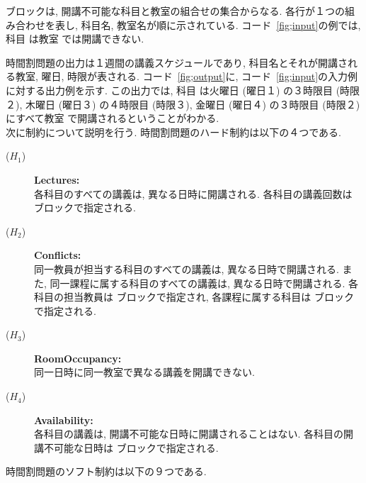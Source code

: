  ブロックは, 開講不可能な科目と教室の組合せの集合からなる. 各行が１つの組み合わせを表し, 科目名, 教室名が順に示されている. コード~\ref{fig;input}の例では, 科目  は教室  では開講できない.

時間割問題の出力は１週間の講義スケジュールであり, 科目名とそれが開講される教室, 曜日, 時限が表される. コード~\ref{fig;output}に, コード~\ref{fig;input}の入力例に対する出力例を示す. この出力では, 科目  は火曜日 (曜日１) の３時限目 (時限２), 木曜日 (曜日３) の４時限目 (時限３), 金曜日 (曜日４) の３時限目 (時限２) にすべて教室  で開講されるということがわかる.\\

次に制約について説明を行う. 時間割問題のハード制約は以下の４つである.

\begin{description}
\item[($H_1$)] \textbf{Lectures:}\\
各科目のすべての講義は, 異なる日時に開講される. 各科目の講義回数は  ブロックで指定される.
\item[($H_2$)] \textbf{Conflicts:}\\
同一教員が担当する科目のすべての講義は, 異なる日時で開講される. また, 同一課程に属する科目のすべての講義は, 異なる日時で開講される. 各科目の担当教員は  ブロックで指定され, 各課程に属する科目は  ブロックで指定される.
\item[($H_3$)] \textbf{RoomOccupancy:}\\
同一日時に同一教室で異なる講義を開講できない.
\item[($H_4$)] \textbf{Availability:}\\
各科目の講義は, 開講不可能な日時に開講されることはない. 各科目の開講不可能な日時は  ブロックで指定される.
\end{description}

時間割問題のソフト制約は以下の９つである.

